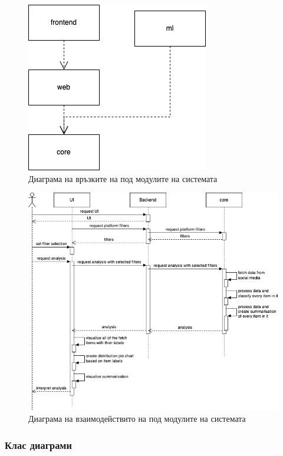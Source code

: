 \documentclass{article}
\begin{document}
    \newpage\begin{figure}[H]
                \centering
                \captionsetup{justification=centering}
                \includegraphics{chapter-04/modules.png}
                \caption{Диаграма на връзките на под модулите на системата}
    \end{figure}

    \newpage\begin{figure}[H]
                \centering
                \captionsetup{justification=centering}
                \includegraphics[width=450px, keepaspectratio]{chapter-04/flow.png}
                \caption{Диаграма на взаимодействито на под модулите на системата}
    \end{figure}

    \subsubsection{Клас диаграми}
\end{document}
